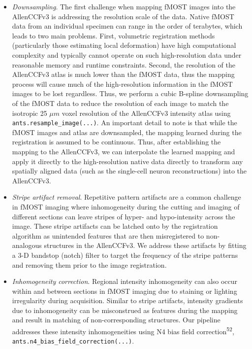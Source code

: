 \documentclass[
  12pt,
]{article}
\begin{document}
\begin{itemize}
\item
  \emph{Downsampling}. The first challenge when mapping fMOST images
  into the AllenCCFv3 is addressing the resolution scale of the data.
  Native fMOST data from an individual specimen can range in the order
  of terabytes, which leads to two main problems. First, volumetric
  registration methods (particularly those estimating local deformation)
  have high computational complexity and typically cannot operate on
  such high-resolution data under reasonable memory and runtime
  constraints. Second, the resolution of the AllenCCFv3 atlas is much
  lower than the fMOST data, thus the mapping process will cause much of
  the high-resolution information in the fMOST images to be lost
  regardless. Thus, we perform a cubic B-spline downsampling of the
  fMOST data to reduce the resolution of each image to match the
  isotropic 25 \(\mu m\) voxel resolution of the AllenCCFv3 intensity
  atlas using \texttt{ants.resample\_image(...)}. An important detail to
  note is that while the fMOST images and atlas are downsampled, the
  mapping learned during the registration is assumed to be continuous.
  Thus, after establishing the mapping to the AllenCCFv3, we can
  interpolate the learned mapping and apply it directly to the
  high-resolution native data directly to transform any spatially
  aligned data (such as the single-cell neuron reconstructions) into the
  AllenCCFv3.
\item
  \emph{Stripe artifact removal}. Repetitive pattern artifacts are a
  common challenge in fMOST imaging where inhomogeneity during the
  cutting and imaging of different sections can leave stripes of hyper-
  and hypo-intensity across the image. These stripe artifacts can be
  latched onto by the registration algorithm as unintended features that
  are then misregistered to non-analogous structures in the AllenCCFv3.
  We address these artifacts by fitting a 3-D bandstop (notch) filter to
  target the frequency of the stripe patterns and removing them prior to
  the image registration.
\item
  \emph{Inhomogeneity correction}. Regional intensity inhomogeneity can
  also occur within and between sections in fMOST imaging due to
  staining or lighting irregularity during acquisition. Similar to
  stripe artifacts, intensity gradients due to inhomogeneity can be
  misconstrued as features during the mapping and result in matching of
  non-corresponding structures. Our pipeline addresses these intensity
  inhomogeneities using N4 bias field correction\textsuperscript{52},
  \texttt{ants.n4\_bias\_field\_correction(...)}.
\end{itemize}
\end{document}
